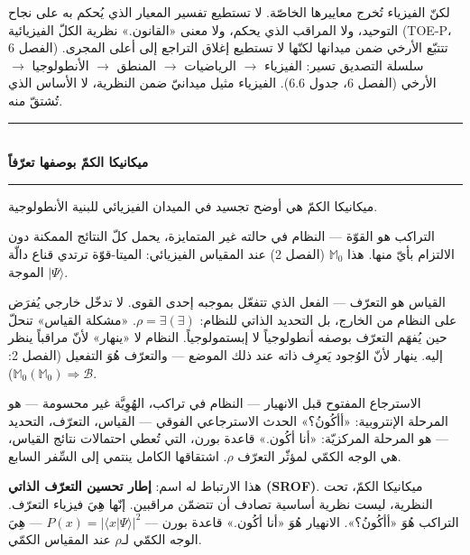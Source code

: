 \documentclass[10pt, openany, oneside]{book}
\renewcommand{\normalsize}{\fontsize{10}{13}\selectfont}
\begin{document}
لكنّ الفيزياء تُخرج معاييرها الخاصّة. لا تستطيع تفسير المعيار الذي يُحكم به على نجاح التوحيد، ولا المراقب الذي يحكم، ولا معنى «القانون.» نظرية الكلّ الفيزيائية (TOE-P، الفصل 6) تتتبّع الأرخي ضمن ميدانها لكنّها لا تستطيع إغلاق التراجع إلى أعلى المجرى. سلسلة التصديق تسير: الفيزياء $\to$ الرياضيات $\to$ المنطق $\to$ الأنطولوجيا $\to$ الأرخي (الفصل 6، جدول 6.6). الفيزياء مثيل ميدانيّ ضمن النظرية، لا الأساس الذي تُشتقّ منه.

\vspace{1.5em}

\begin{center}
    \rule{0.3\textwidth}{0.4pt}\\[0.5em]
    {\normalsize\bfseries ميكانيكا الكمّ بوصفها تعرّفاً}\\[0.3em]
    \rule{0.3\textwidth}{0.4pt}
\end{center}

\vspace{1em}

\noindent ميكانيكا الكمّ هي أوضح تجسيد في الميدان الفيزيائي للبنية الأنطولوجية.

التراكب هو القوّة --- النظام في حالته غير المتمايزة، يحمل كلّ النتائج الممكنة دون الالتزام بأيّ منها. هذا $\mathbb{M}_0$ (الفصل 2) عند المقياس الفيزيائي: الميتا-قوّة ترتدي قناع دالّة الموجة $|\Psi\rangle$.

القياس هو التعرّف --- الفعل الذي تتفعّل بموجبه إحدى القوى. لا تدخّل خارجي يُفرَض على النظام من الخارج، بل التحديد الذاتي للنظام: $\rho = \exists(\exists)$. «مشكلة القياس» تنحلّ حين يُفهَم التعرّف بوصفه أنطولوجياً لا إبستمولوجياً. النظام لا «ينهار» لأنّ مراقباً ينظر إليه. ينهار لأنّ الوُجود يَعرِف ذاته عند ذلك الموضع --- والتعرّف هُوَ التفعيل (الفصل 2: $\mathbb{M}_0(\mathbb{M}_0) \Rightarrow \mathcal{B}$).

الاسترجاع المفتوح قبل الانهيار --- النظام في تراكب، الهُوِيَّة غير محسومة --- هو المرحلة الإنتروبية: «أأكُونُ؟» الحدث الاسترجاعي الفوقي --- القياس، التعرّف، التحديد --- هو المرحلة المركزيّة: «أنا أكُون.» قاعدة بورن، التي تُعطي احتمالات نتائج القياس، هي الوجه الكمّي لمؤثّر التعرّف $\rho$. اشتقاقها الكامل ينتمي إلى السِّفر السابع.

هذا الارتباط له اسم: \textbf{إطار تحسين التعرّف الذاتي (SROF)}. ميكانيكا الكمّ، تحت النظرية، ليست نظرية أساسية تصادف أن تتضمّن مراقبين. إنّها هِيَ فيزياء التعرّف. التراكب هُوَ «أأكُونُ؟». الانهيار هُوَ «أنا أكُون.» قاعدة بورن --- $P(x) = |\langle x | \Psi \rangle|^2$ --- هِيَ الوجه الكمّي لـ$\rho$ عند المقياس الكمّي.

\vspace{1.5em}
\end{document}
